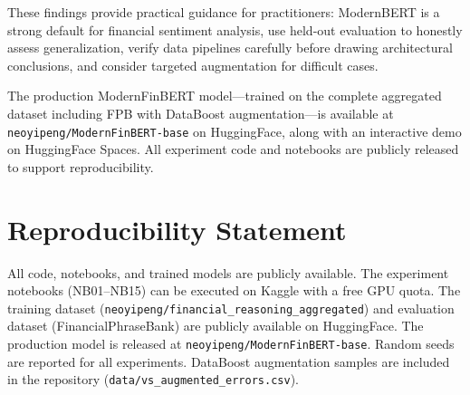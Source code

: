 \documentclass[11pt]{article}
\begin{document}
These findings provide practical guidance for practitioners: ModernBERT is a strong default for financial sentiment analysis, use held-out evaluation to honestly assess generalization, verify data pipelines carefully before drawing architectural conclusions, and consider targeted augmentation for difficult cases.

The production ModernFinBERT model---trained on the complete aggregated dataset including FPB with DataBoost augmentation---is available at \texttt{neoyipeng/ModernFinBERT-base} on HuggingFace, along with an interactive demo on HuggingFace Spaces. All experiment code and notebooks are publicly released to support reproducibility.

\section*{Reproducibility Statement}

All code, notebooks, and trained models are publicly available. The experiment notebooks (NB01--NB15) can be executed on Kaggle with a free GPU quota. The training dataset (\texttt{neoyipeng/financial\_reasoning\_aggregated}) and evaluation dataset (FinancialPhraseBank) are publicly available on HuggingFace. The production model is released at \texttt{neoyipeng/ModernFinBERT-base}. Random seeds are reported for all experiments. DataBoost augmentation samples are included in the repository (\texttt{data/vs\_augmented\_errors.csv}).




\end{document}
